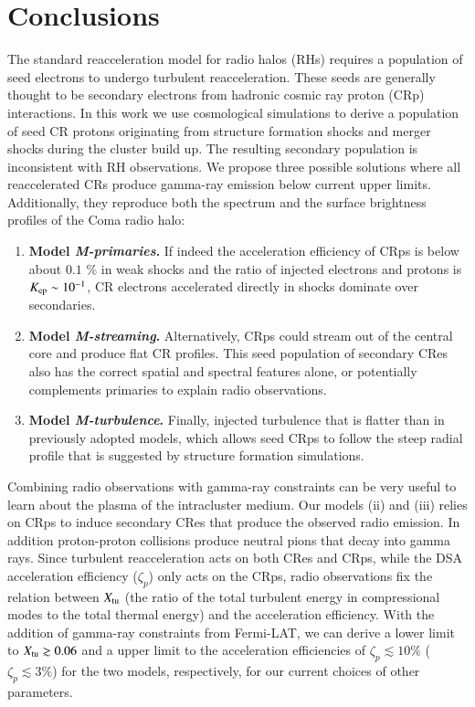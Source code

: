 \documentclass[a4paper,fleqn,usenatbib]{mnras}
\begin{document}
\section{Conclusions}
\label{sec:conclusions}

The standard reacceleration model for radio halos (RHs) requires a
population of seed electrons to undergo turbulent
reacceleration. These seeds are generally thought to be secondary
electrons from hadronic cosmic ray proton (CRp) interactions. In this
work we use cosmological simulations to derive a population of seed CR
protons originating from structure formation shocks and merger shocks
during the cluster build up. The resulting secondary population is
inconsistent with RH observations. We propose three possible solutions
where all reaccelerated CRs produce gamma-ray emission below current
upper limits. Additionally, they reproduce both the spectrum and the
surface brightness profiles of the Coma radio halo:

\begin{enumerate}
\item {\bf Model {\em M-primaries}.} If indeed the acceleration
  efficiency of CRps is below about $0.1$ {\%} in weak shocks and the
  ratio of injected electrons and protons is $K_{{\mathrm{ep}}} \sim
  10^{-1}$, CR electrons accelerated directly in shocks dominate over
  secondaries.
\item {\bf Model {\em M-streaming}.} Alternatively, CRps could stream
  out of the central core and produce flat CR profiles. This seed
  population of secondary CRes also has the correct spatial and
  spectral features alone, or potentially complements primaries to
  explain radio observations.
\item {\bf Model {\em M-turbulence}.}  Finally, injected turbulence
  that is flatter than in previously adopted models, which allows seed
  CRps to follow the steep radial profile that is suggested by
  structure formation simulations.
\end{enumerate}

Combining radio observations with gamma-ray constraints can be very
useful to learn about the plasma of the intracluster medium. Our
models (ii) and (iii) relies on CRps to induce secondary CRes that
produce the observed radio emission. In addition proton-proton
collisions produce neutral pions that decay into gamma rays. Since
turbulent reacceleration acts on both CRes and CRps, while the DSA
acceleration efficiency ($\zeta_p$) only acts on the CRps, radio
observations fix the relation between $X_{\mathrm{tu}}$ (the ratio of the
total turbulent energy in compressional modes to the total thermal
energy) and the acceleration efficiency. With the addition of
gamma-ray constraints from Fermi-LAT, we can derive a lower limit to
$X_{\mathrm{tu}}\gtrsim0.06$ and a upper limit to the acceleration
efficiencies of $\zeta_p\lesssim 10\%$ ($\zeta_p\lesssim 3\%$) for
the two models, respectively, for our current choices of other
parameters.
\end{document}
